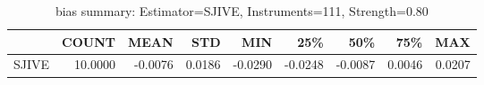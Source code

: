 \begin{table}[ht]
\centering
\caption{bias summary: Estimator=SJIVE, Instruments=111, Strength=0.80}
\begin{tabular}{lrrrrrrrr}
\toprule
 & COUNT & MEAN & STD & MIN & 25\% & 50\% & 75\% & MAX \\
\midrule
SJIVE & 10.0000 & -0.0076 & 0.0186 & -0.0290 & -0.0248 & -0.0087 & 0.0046 & 0.0207 \\
\bottomrule
\end{tabular}
\end{table}
